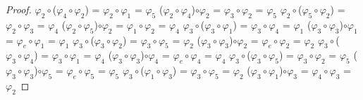 \documentclass[10pt,a4paper,oneside]{article}
\begin{document}
\begin{proof}
					\newline
					$\varphi_{2}\circ$($\varphi_{4}\circ\varphi_{2}$) = $\varphi_{2}\circ\varphi_{1}$ = $\varphi_{5}$
					\newline
					($\varphi_{2}\circ\varphi_{4}$)$\circ\varphi_{2}$ = $\varphi_{3}\circ\varphi_{2}$ = $\varphi_{5}$
					\newline
					\newline
					$\varphi_{2}\circ$($\varphi_{5}\circ\varphi_{2}$) = $\varphi_{2}\circ\varphi_{3}$ = $\varphi_{4}$
					\newline
					($\varphi_{2}\circ\varphi_{5}$)$\circ\varphi_{2}$ = $\varphi_{1}\circ\varphi_{2}$ = $\varphi_{4}$
					\newline
					\newline
					$\varphi_{3}\circ$($\varphi_{3}\circ\varphi_{1}$) = $\varphi_{3}\circ\varphi_{4}$ = $\varphi_{1}$
					\newline
					($\varphi_{3}\circ\varphi_{3}$)$\circ\varphi_{1}$ = $\varphi_{e}\circ\varphi_{1}$ = $\varphi_{1}$
					\newline
					\newline
					$\varphi_{3}\circ$($\varphi_{3}\circ\varphi_{2}$) = $\varphi_{3}\circ\varphi_{5}$ = $\varphi_{2}$
					\newline
					($\varphi_{3}\circ\varphi_{3}$)$\circ\varphi_{2}$ = $\varphi_{e}\circ\varphi_{2}$ = $\varphi_{2}$
					\newline
					\newline
					$\varphi_{3}\circ$($\varphi_{3}\circ\varphi_{4}$) = $\varphi_{3}\circ\varphi_{1}$ = $\varphi_{4}$
					\newline
					($\varphi_{3}\circ\varphi_{3}$)$\circ\varphi_{4}$ = $\varphi_{e}\circ\varphi_{4}$ = $\varphi_{4}$
					\newline
					\newline
					$\varphi_{3}\circ$($\varphi_{3}\circ\varphi_{5}$) = $\varphi_{3}\circ\varphi_{2}$ = $\varphi_{5}$
					\newline
					($\varphi_{3}\circ\varphi_{3}$)$\circ\varphi_{5}$ = $\varphi_{e}\circ\varphi_{5}$ = $\varphi_{5}$
					\newline
					\newline
					$\varphi_{3}\circ$($\varphi_{1}\circ\varphi_{3}$) = $\varphi_{3}\circ\varphi_{5}$ = $\varphi_{2}$
					\newline
					($\varphi_{3}\circ\varphi_{1}$)$\circ\varphi_{3}$ = $\varphi_{4}\circ\varphi_{3}$ = $\varphi_{2}$
					\newline

\end{proof}
\end{document}
